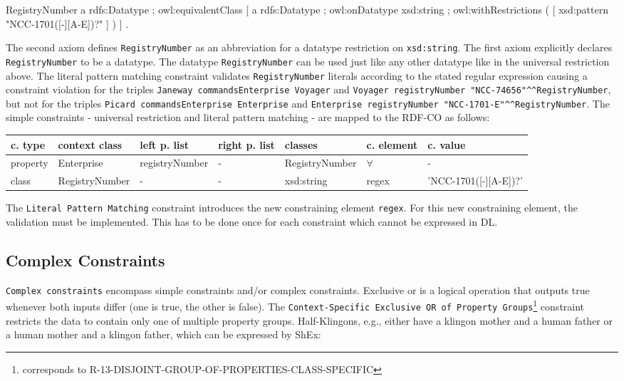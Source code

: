 \documentclass{llncs}
\newcommand{\ms}[1]{\texttt{#1}}
\newenvironment{gcotable}{
  \scriptsize
  \sffamily
  \vspace{0cm}
	\begin{center}
  \begin{tabular}{l|l|l|l|l|l|l}
  \hline
  \textbf{c. type} & \textbf{context class} & \textbf{left p. list} & \textbf{right p. list} & \textbf{classes} & \textbf{c. element} & \textbf{c. value} \\
  \hline

}{
  \hline
  \end{tabular}
	\end{center}
}
\begin{document}
\begin{ex}
RegistryNumber
    a rdfs:Datatype ; owl:equivalentClass [ a rdfs:Datatype ;
        owl:onDatatype xsd:string ;
        owl:withRestrictions ( [ xsd:pattern "NCC-1701([-][A-E])?" ] ) ] .
\end{ex}

The second axiom defines \ms{RegistryNumber} as an abbreviation for a datatype restriction on \ms{xsd:string}. 
The first axiom explicitly declares \ms{RegistryNumber} to be a datatype. 
The datatype \ms{RegistryNumber} can be used just like any other datatype like in the universal restriction above.
The literal pattern matching constraint validates \ms{RegistryNumber} literals according to the stated regular expression causing a constraint violation for the triples 
\ms{Janeway commandsEnterprise Voyager} and \ms{Voyager registryNumber "NCC-74656"\textasciicircum{}\textasciicircum{}RegistryNumber}, 
but not for the triples \ms{Picard commandsEnterprise Enterprise} and \ms{Enterprise registryNumber "NCC-1701-E"\textasciicircum{}\textasciicircum{}RegistryNumber}.
The simple constraints - universal restriction and literal pattern matching - are mapped to the RDF-CO as follows:

\begin{gcotable}
property & Enterprise & registryNumber & - & RegistryNumber & $\forall$ & - \\
class & RegistryNumber & - & - & xsd:string & regex & 'NCC-1701([-][A-E])?' \\
\end{gcotable}

The \ms{Literal Pattern Matching} constraint introduces the new constraining element \ms{regex}.
For this new constraining element, the validation must be implemented.
This has to be done once for each constraint which cannot be expressed in DL.

\subsection{Complex Constraints}

\ms{Complex constraints} encompass simple constraints and/or complex constraints.
Exclusive or is a logical operation that outputs true whenever both inputs differ (one is true, the other is false).
The \ms{Context-Specific Exclusive OR of Property Groups}\footnote{corresponds to R-13-DISJOINT-GROUP-OF-PROPERTIES-CLASS-SPECIFIC} 
constraint restricts the data to contain only one of multiple property groups.
Half-Klingons, e.g., either have a klingon mother and a human father or a human mother and a klingon father, which can be expressed by ShEx:
\end{document}
